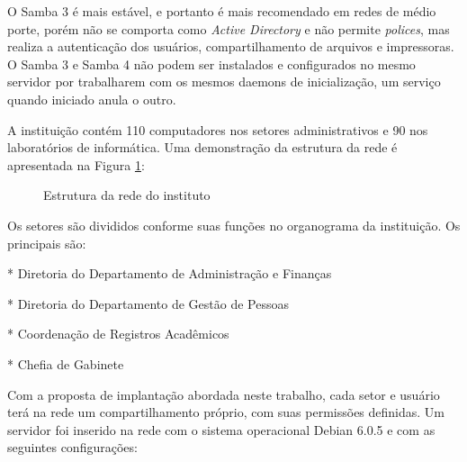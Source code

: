 O Samba 3 é mais estável, e portanto é mais recomendado em redes de médio porte, porém não se comporta como \textit{Active Directory} e não permite \textit{polices}, mas realiza a autenticação dos usuários, compartilhamento de arquivos e impressoras.
O Samba 3 e Samba 4 não podem ser instalados e configurados no mesmo servidor por trabalharem com os mesmos daemons de inicialização, um serviço quando iniciado anula o outro.


A instituição contém 110 computadores nos setores administrativos e 90 nos laboratórios de informática. Uma demonstração da estrutura da rede é apresentada na Figura \ref{rede}:

\begin{figure}[h!]
   	\centering
   	\caption{Estrutura da rede do instituto}
    \label{rede}
\end{figure}

\pagebreak
          				
Os setores são divididos conforme suas funções no organograma da instituição. Os principais são:

* Diretoria do Departamento de Administração e Finanças

* Diretoria do Departamento de Gestão de Pessoas

* Coordenação de Registros Acadêmicos

* Chefia de Gabinete

Com a proposta de implantação abordada neste trabalho, cada setor e usuário terá na rede um compartilhamento próprio, com suas permissões definidas. Um servidor foi inserido na rede com o sistema operacional Debian 6.0.5 e com as seguintes configurações:

